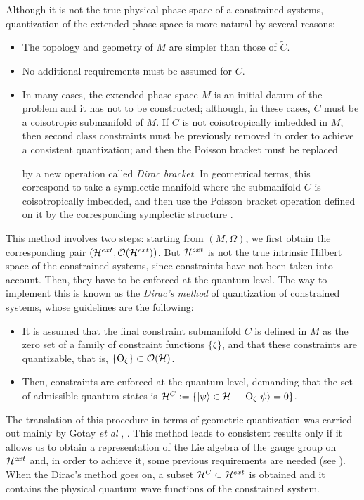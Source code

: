 \documentclass[12pt]{article}
\theoremstyle{plain}
\def\H{{\cal H}}
\def\He{{\cal H}^{ext}}
\def\Hc{{\cal H}^C}
\def\sta{|\psi \rangle }
\def\Op{{\rm O}}
\begin{document}
Although it is not the true physical phase space of a constrained
systems,
quantization of the extended phase space is more natural by several
reasons:
\begin{itemize}
\item
The topology and geometry of $M$ are simpler than those of $\tilde C$.
\item
No additional requirements must be assumed for $C$.
\item
In many cases, the extended phase space $M$ is
an initial datum of the problem and it has not to be constructed;
although, in these cases, $C$ must be a coisotropic submanifold of $M$.
If $C$ is not coisotropically imbedded in $M$, then
second class constraints must be previously removed in order to achieve
a consistent quantization; and then the Poisson bracket must be replaced

by
a new operation called {\it Dirac bracket}.
In geometrical terms, this correspond to take
a symplectic manifold where the submanifold $C$
is coisotropically imbedded, and then use the Poisson bracket
operation defined on it by the corresponding symplectic structure
\cite{Sn-74}.
\end{itemize}
This method involves two steps:
starting from $(M,\Omega )$, we first obtain the corresponding pair
$(\He ,{\cal O}(\He ))$.
But $\He$ is not the true intrinsic Hilbert space of the constrained
systems, since constraints
have not been taken into account. Then, they have to be enforced at the
quantum level.
The way to implement this is known as the
{\it Dirac's method} of quantization of constrained systems,
whose guidelines are the following:
\begin{itemize}
\item
It is assumed that the final constraint submanifold $C$
is defined in $M$ as the zero set of a family of constraint functions
$\{ \zeta \}$,
and that these constraints are quantizable, that is,
$\{ \Op_\zeta \} \subset {\cal O}(\H )$.
\item
Then, constraints are enforced at the quantum level,
demanding that the set of admissible quantum states is
$\Hc := \{ \sta \in \H \ \mid \ \Op_\zeta \sta = 0 \}$.
\end{itemize}

The translation of this procedure in terms of geometric quantization
was carried out mainly by Gotay {\it et al}  \cite{Go-cit},
\cite{GS-81}.
This method leads to consistent results only if
it allows us to obtain a representation of the Lie algebra
of the gauge group on $\He$ and, in order to achieve it,
some previous requirements are needed (see \cite{GS-81}).
When the Dirac's method goes on,
a subset $\Hc \subset \He$ is obtained and it contains
the physical quantum wave functions of the constrained system.
\end{document}
